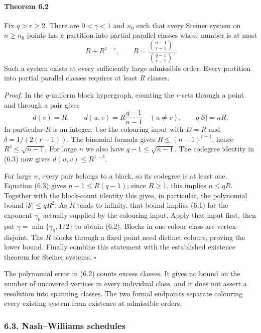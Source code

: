 \documentclass[english,11pt,a4paper]{article}
\begin{document}
\par
\begin{samepage}
\paragraph{Theorem 6.2}\label{theorem-6.2}

Fix \(q>r\ge2\). There are \(0<\gamma<1\) and \(n_0\) such that every Steiner system on \(n\ge n_0\) points has a partition into partial parallel classes whose number is at most \[R+R^{1-\gamma},\qquad
R=\frac{\binom{n-1}{r-1}}{\binom{q-1}{r-1}}.
\tag{6.2}\] Such a system exists at every sufficiently large admissible order. Every partition into partial parallel classes requires at least \(R\) classes.

\end{samepage}
\emph{Proof.} In the \(q\)-uniform block hypergraph, counting the \(r\)-sets through a point and through a pair gives \[d(v)=R,\qquad
d(u,v)=R\frac{q-1}{n-1}\quad(u\ne v),\qquad
q|\mathcal S|=nR.
\tag{6.3}\] In particular \(R\) is an integer. Use the colouring input with \(D=R\) and \(\delta=1/(2(r-1))\). The binomial formula gives \(R\le(n-1)^{r-1}\), hence \(R^\delta\le\sqrt{n-1}\). For large \(n\) we also have \(q-1\le\sqrt{n-1}\). The codegree identity in (6.3) now gives \(d(u,v)\le R^{1-\delta}\).

For large \(n\), every pair belongs to a block, so its codegree is at least one. Equation (6.3) gives \(n-1\le R(q-1)\); since \(R\ge1\), this implies \(n\le qR\). Together with the block-count identity this gives, in particular, the polynomial bound \(|\mathcal S|\le qR^2\). As \(R\) tends to infinity, that bound implies (6.1) for the exponent \(\gamma_0\) actually supplied by the colouring input. Apply that input first, then put \(\gamma=\min\{\gamma_0,1/2\}\) to obtain (6.2). Blocks in one colour class are vertex-disjoint. The \(R\) blocks through a fixed point need distinct colours, proving the lower bound. Finally combine this statement with the established existence theorem for Steiner systems. \(\square\)

The polynomial error in (6.2) counts excess classes. It gives no bound on the number of uncovered vertices in every individual class, and it does not assert a resolution into spanning classes. The two formal endpoints separate colouring every existing system from existence at admissible orders.


\subsubsection{6.3. Nash--Williams schedules}\label{nashwilliams-schedules}
\end{document}
